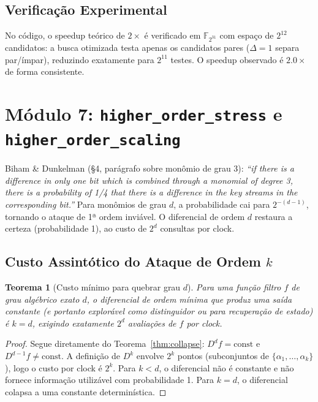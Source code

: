 \documentclass[12pt,a4paper]{article}
\newtheorem{theorem}{Teorema}[section]
\theoremstyle{definition}
\theoremstyle{remark}
\newcommand{\GF}[1]{\mathbb{F}_{2^{#1}}}
\newcommand{\filter}{f}
\begin{document}
\subsection{Verificação Experimental}

No código, o speedup teórico de $2\times$ é verificado em $\GF{31}$ com
espaço de $2^{12}$ candidatos: a busca otimizada testa apenas os candidatos
pares ($\Delta=1$ separa par/ímpar), reduzindo exatamente para $2^{11}$
testes. O speedup observado é $2.0\times$ de forma consistente.

\section{Módulo 7: \texttt{higher\_order\_stress} e \texttt{higher\_order\_scaling}}
\label{sec:scaling}

\begin{paperref}
  Biham \& Dunkelman (\S4, parágrafo sobre monômio de grau 3):
  \textit{``if there is a difference in only one bit which is combined through
  a monomial of degree 3, there is a probability of 1/4 that there is a
  difference in the key streams in the corresponding bit.''}
  Para monômios de grau $d$, a probabilidade cai para $2^{-(d-1)}$, tornando
  o ataque de 1ª ordem inviável. O diferencial de ordem $d$ restaura a
  certeza (probabilidade 1), ao custo de $2^d$ consultas por clock.
\end{paperref}

\subsection{Custo Assintótico do Ataque de Ordem $k$}

\begin{theorem}[Custo mínimo para quebrar grau $d$]
  \label{thm:cost}
  Para uma função filtro $\filter$ de grau algébrico exato $d$, o diferencial
  de ordem mínima que produz uma saída constante (e portanto explorável como
  distinguidor ou para recuperação de estado) é $k = d$, exigindo exatamente
  $2^d$ avaliações de $\filter$ por clock.
\end{theorem}

\begin{proof}
  Segue diretamente do Teorema~\ref{thm:collapse}: $D^d f = \text{const}$ e
  $D^{d-1} f \neq \text{const}$. A definição de $D^k$ envolve $2^k$ pontos
  (subconjuntos de $\{\alpha_1,\ldots,\alpha_k\}$), logo o custo por clock
  é $2^k$. Para $k < d$, o diferencial não é constante e não fornece
  informação utilizável com probabilidade 1. Para $k = d$, o diferencial
  colapsa a uma constante determinística.
\end{proof}
\end{document}
